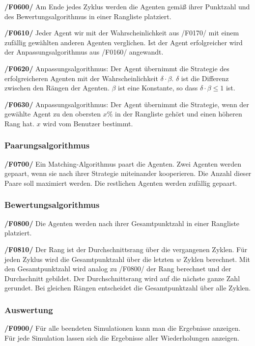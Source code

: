 \textbf{/F0600/}
Am Ende jedes Zyklus werden die Agenten gemäß ihrer Punktzahl und des Bewertungsalgorithmus in einer Rangliste platziert.

\textbf{/F0610/}
Jeder Agent wir mit der Wahrscheinlichkeit aus /F0170/ mit einem zufällig gewählten anderen Agenten verglichen. Ist der Agent erfolgreicher wird der Anpassungsalgorithmus aus /F0160/ angewandt.

\textbf{/F0620/}
Anpassungsalgorithmus: Der Agent übernimmt die Strategie des erfolgreicheren Agenten mit der Wahrscheinlichkeit $\delta \cdot \beta$. $\delta$ ist die Differenz zwischen den Rängen der Agenten. $\beta$ ist eine Konstante, so dass $\delta \cdot \beta \leq 1$ ist.

\textbf{/F0630/}
Anpassungsalgorithmus: Der Agent übernimmt die Strategie, wenn der gewählte Agent zu den obersten $x\%$ in der Rangliste gehört und einen höheren Rang hat. $x$ wird vom Benutzer bestimmt.


\subsubsection{Paarungsalgorithmus}

\textbf{/F0700/}
Ein Matching-Algorithmus paart die Agenten. Zwei Agenten werden gepaart, wenn sie nach ihrer Strategie miteinander kooperieren. Die Anzahl dieser Paare soll maximiert werden. Die restlichen Agenten werden zufällig gepaart.

\subsubsection{Bewertungsalgorithmus}

\textbf{/F0800/}
Die Agenten werden nach ihrer Gesamtpunktzahl in einer Rangliste platziert.

\textbf{/F0810/}
Der Rang ist der Durchschnittsrang über die vergangenen Zyklen. Für jeden Zyklus wird die Gesamtpunktzahl über die letzten $w$ Zyklen berechnet. Mit den Gesamtpunktzahl wird analog zu /F0800/ der Rang berechnet und der Durchschnitt gebildet. Der Durchschnittsrang wird auf die nächste ganze Zahl gerundet. Bei gleichen Rängen entscheidet die Gesamtpunktzahl über alle Zyklen.

\subsubsection{Auswertung}

\textbf{/F0900/}
Für alle beendeten Simulationen kann man die Ergebnisse anzeigen. Für jede Simulation lassen sich die Ergebnisse aller Wiederholungen anzeigen.


